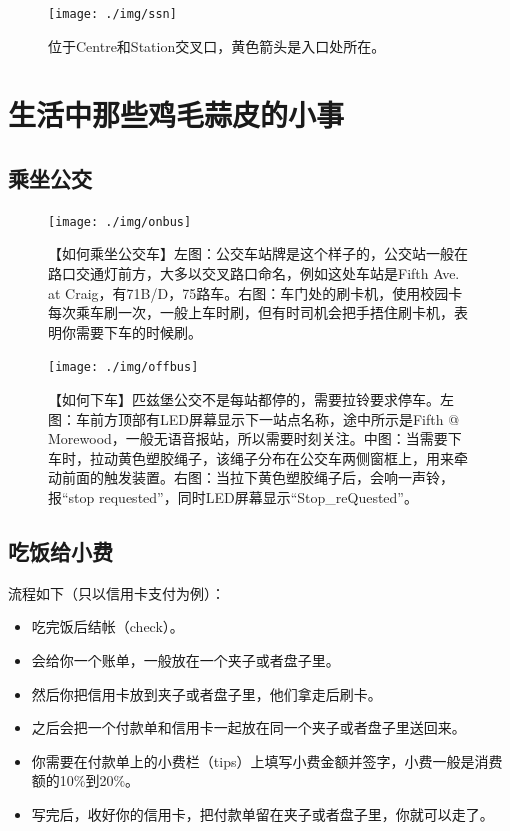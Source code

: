 \documentclass[letterpaper,10pt]{article}
\begin{document}
	\begin{figure}[!h]
		\centering
		\texttt{[image: ./img/ssn]}
		\caption{位于Centre和Station交叉口，黄色箭头是入口处所在。}
		\label{fig:ssn}
	\end{figure}
	
	\section{生活中那些鸡毛蒜皮的小事}
	
	\subsection{乘坐公交}
	
	\begin{figure}[!h]
		\centering
		\texttt{[image: ./img/onbus]}
		\caption{【如何乘坐公交车】左图：公交车站牌是这个样子的，公交站一般在路口交通灯前方，大多以交叉路口命名，例如这处车站是Fifth Ave. at Craig，有71B/D，75路车。右图：车门处的刷卡机，使用校园卡每次乘车刷一次，一般上车时刷，但有时司机会把手捂住刷卡机，表明你需要下车的时候刷。}
	\end{figure}
	
	\begin{figure}[!h]
		\centering
		\texttt{[image: ./img/offbus]}
		\caption{【如何下车】匹兹堡公交不是每站都停的，需要拉铃要求停车。左图：车前方顶部有LED屏幕显示下一站点名称，途中所示是Fifth @ Morewood，一般无语音报站，所以需要时刻关注。中图：当需要下车时，拉动黄色塑胶绳子，该绳子分布在公交车两侧窗框上，用来牵动前面的触发装置。右图：当拉下黄色塑胶绳子后，会响一声铃，报“stop requested”，同时LED屏幕显示“Stop\_reQuested”。}
	\end{figure}
	
	\subsection{吃饭给小费}
	
	流程如下（只以信用卡支付为例）：
	\begin{itemize}
		\item 吃完饭后结帐（check）。
		\item 会给你一个账单，一般放在一个夹子或者盘子里。
		\item 然后你把信用卡放到夹子或者盘子里，他们拿走后刷卡。
		\item 之后会把一个付款单和信用卡一起放在同一个夹子或者盘子里送回来。
		\item 你需要在付款单上的小费栏（tips）上填写小费金额并签字，小费一般是消费额的10\%到20\%。
		\item 写完后，收好你的信用卡，把付款单留在夹子或者盘子里，你就可以走了。
	\end{itemize}
	
\end{document}
